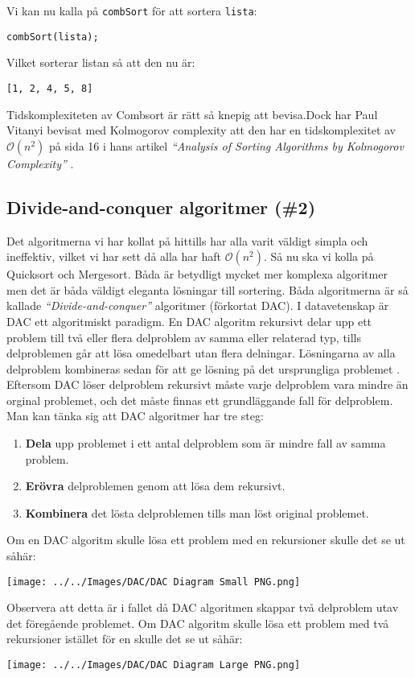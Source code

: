 \documentclass[a4, oneside]{report}
\begin{document}
Vi kan nu kalla på \lstinline{combSort} för att sortera \lstinline{lista}:
\begin{lstlisting}[style=mystyle, numbers=none]
 combSort(lista);
\end{lstlisting}
Vilket sorterar listan så att den nu är:
\begin{lstlisting}[style=mystyle, numbers=none]
 [1, 2, 4, 5, 8]
\end{lstlisting}
Tidskomplexiteten av Combsort är rätt så knepig att bevisa.Dock har Paul Vitanyi bevisat med Kolmogorov complexity att den har en tidskomplexitet av $\mathcal{O}(n^2)$ på sida 16 i hans artikel \textit{“Analysis of Sorting Algorithms by Kolmogorov Complexity”} \cite{11}.
 
\subsection{Divide-and-conquer algoritmer (\#2)}
Det algoritmerna vi har kollat på hittills har alla varit väldigt simpla och ineffektiv, vilket vi har sett då alla har haft $\mathcal{O}(n^2)$. Så nu ska vi kolla på Quicksort och Mergesort. Båda är betydligt mycket mer komplexa algoritmer men det är båda väldigt eleganta lösningar till sortering. Båda algoritmerna är så kallade \textit{“Divide-and-conquer”} algoritmer (förkortat DAC). I datavetenskap är DAC ett algoritmiskt paradigm. En DAC algoritm rekursivt delar upp ett problem till två eller flera delproblem av samma eller relaterad typ, tills delproblemen går att lösa omedelbart utan flera delningar. Lösningarna av alla delproblem kombineras sedan för att ge lösning på det ursprungliga problemet \cite{12}.
Eftersom DAC löser delproblem rekursivt måste varje delproblem vara mindre än orginal problemet, och det måste finnas ett grundläggande fall för delproblem. Man kan tänka sig att DAC algoritmer har tre steg:
\begin{enumerate}
   \item \textbf{Dela} upp problemet i ett antal delproblem som är mindre fall av samma problem.
   \item \textbf{Erövra} delproblemen genom att lösa dem rekursivt.
   \item \textbf{Kombinera} det lösta delproblemen tills man löst original problemet.
\end{enumerate}
Om en DAC algoritm skulle lösa ett problem med en rekursioner skulle det se ut såhär:
\begin{center}
  \texttt{[image: ../../Images/DAC/DAC Diagram Small PNG.png]}
\end{center}
Observera att detta är i fallet då DAC algoritmen skappar två delproblem utav det föregående problemet. Om DAC algoritm skulle lösa ett problem med två rekursioner istället för en skulle det se ut såhär: \cite{13}
\begin{center}
  \texttt{[image: ../../Images/DAC/DAC Diagram Large PNG.png]}
\end{center}
\end{document}
